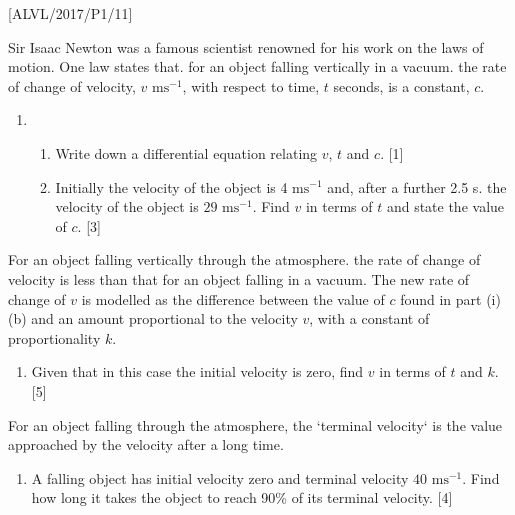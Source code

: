 \item {[}ALVL/2017/P1/11{]}

Sir Isaac Newton was a famous scientist renowned for his work on the
laws of motion. One law states that. for an object falling vertically
in a vacuum. the rate of change of velocity, $v$ $\mathrm{ms^{-1}}$,
with respect to time, $t$ seconds, is a constant, $c$.
\begin{enumerate}
\item {}
\begin{enumerate}
\item Write down a differential equation relating $v$, $t$ and $c$. \hfill{}{[}1{]}
\item Initially the velocity of the object is 4 $\mathrm{ms^{-1}}$ and,
after a further 2.5 s. the velocity of the object is $29$ $\mathrm{ms^{-1}}$.
Find $v$ in terms of $t$ and state the value of $c$. \hfill{}{[}3{]}
\end{enumerate}
\end{enumerate}
For an object falling vertically through the atmosphere. the rate
of change of velocity is less than that for an object falling in a
vacuum. The new rate of change of $v$ is modelled as the difference
between the value of $c$ found in part (i)(b) and an amount proportional
to the velocity $v$, with a constant of proportionality $k$.
\begin{enumerate}
\item Given that in this case the initial velocity is zero, find $v$ in
terms of $t$ and $k$. \hfill{}{[}5{]}
\end{enumerate}
For an object falling through the atmosphere, the \textquoteleft terminal
velocity\textquoteleft{} is the value approached by the velocity after
a long time.
\begin{enumerate}
\item A falling object has initial velocity zero and terminal velocity $40$
$\mathrm{ms^{-1}}$. Find how long it takes the object to reach 90\%
of its terminal velocity.\hfill{} {[}4{]}
\end{enumerate}
